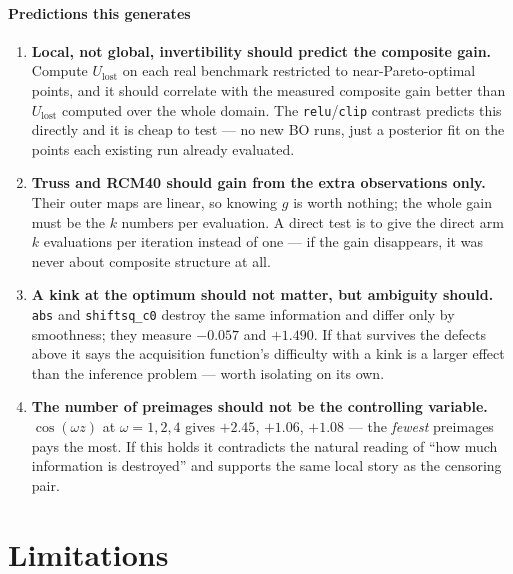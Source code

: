 \documentclass[11pt]{article}
\newcommand{\Ulost}{U_{\text{lost}}}
\begin{document}
\subsection{Predictions this generates}

\begin{enumerate}
\item \textbf{Local, not global, invertibility should predict the composite
gain.} Compute $\Ulost$ on each real benchmark restricted to near-Pareto-optimal
points, and it should correlate with the measured composite gain better than
$\Ulost$ computed over the whole domain. The \texttt{relu}/\texttt{clip}
contrast predicts this directly and it is cheap to test --- no new BO runs, just
a posterior fit on the points each existing run already evaluated.

\item \textbf{Truss and RCM40 should gain from the extra observations only.}
Their outer maps are linear, so knowing $g$ is worth nothing; the whole gain
must be the $k$ numbers per evaluation. A direct test is to give the direct arm
$k$ evaluations per iteration instead of one --- if the gain disappears, it was
never about composite structure at all.

\item \textbf{A kink at the optimum should not matter, but ambiguity should.}
\texttt{abs} and \texttt{shiftsq\_c0} destroy the same information and differ
only by smoothness; they measure $-0.057$ and $+1.490$. If that survives the
defects above it says the acquisition function's difficulty with a kink is a
larger effect than the inference problem --- worth isolating on its own.

\item \textbf{The number of preimages should not be the controlling variable.}
$\cos(\omega z)$ at $\omega=1,2,4$ gives $+2.45$, $+1.06$, $+1.08$ --- the
\emph{fewest} preimages pays the most. If this holds it contradicts the natural
reading of ``how much information is destroyed'' and supports the same local
story as the censoring pair.
\end{enumerate}

\part{Limitations}
\label{part:limits}
\end{document}
